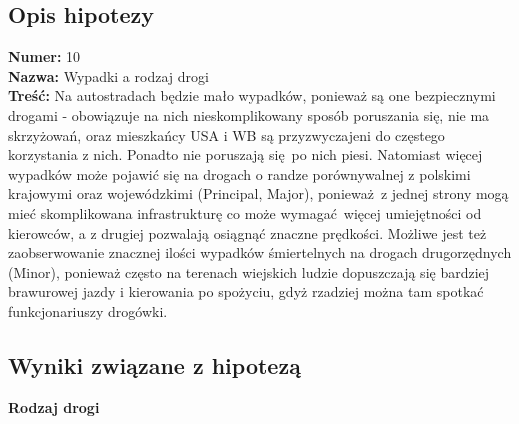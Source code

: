 \subsection{Opis hipotezy}\label{opis-hipotezy}

\textbf{Numer:} 10\\\textbf{Nazwa:} Wypadki a rodzaj
drogi\\\textbf{Treść:} Na autostradach będzie mało wypadków, ponieważ są
one bezpiecznymi drogami - obowiązuje na nich nieskomplikowany sposób
poruszania się, nie ma skrzyżowań, oraz mieszkańcy USA i WB są
przyzwyczajeni do częstego korzystania z nich. Ponadto nie poruszają
się~po nich piesi. Natomiast więcej wypadków może pojawić się na drogach
o randze porównywalnej z polskimi krajowymi oraz wojewódzkimi
(Principal, Major), ponieważ~z jednej strony mogą mieć skomplikowana
infrastrukturę co może wymagać~więcej umiejętności od kierowców, a z
drugiej pozwalają osiągnąć znaczne prędkości. Możliwe jest też
zaobserwowanie znacznej ilości wypadków śmiertelnych na drogach
drugorzędnych (Minor), ponieważ często na terenach wiejskich ludzie
dopuszczają się bardziej brawurowej jazdy i kierowania po spożyciu, gdyż
rzadziej można tam spotkać funkcjonariuszy drogówki.

\subsection{Wyniki związane z
hipotezą}\label{wyniki-zwiazane-z-hipoteza}

\textbf{Rodzaj drogi}

